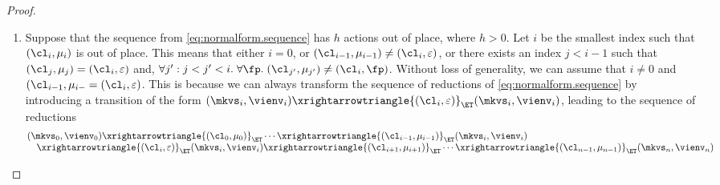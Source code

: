 \begin{proof}
\begin{enumerate}
\item Suppose that the sequence from \cref{eq:normalform.sequence} has $h$ actions out of place, 
where $h > 0$. Let $i$ be the smallest index such that $(\cl_{i}, \mu_{i})$ is out of place. 
This means that either $i = 0$, or $(\cl_{i-1}, \mu_{i-1}) \neq (\cl_{i}, \varepsilon)$, 
or there exists an index $j < i -1 $ such that $(\cl_{j}, \mu_{j}) = (\cl_{i}, \varepsilon)$ 
and, $\forall j': j < j' < i.\;\forall \fp.\;(\cl_{j'}, \mu_{j'}) \neq (\cl_{i}, \fp)$. 
Without loss of generality, we can assume that $i \neq 0$ and $(\cl_{i-1}, \mu_{i-} = (\cl_{i}, \varepsilon)$. 
This is because we can always transform the sequence of reductions of \cref{eq:normalform.sequence} by 
introducing a transition of the form $(\mkvs_{i}, \vienv_{i}) \xrightarrowtriangle{(\cl_{i}, \varepsilon)}_{\ET}
(\mkvs_{i}, \vienv_{i})$, leading to the sequence of reductions
\[
\begin{array}{@{}l@{}}
(\mkvs_{0}, \vienv_{0}) \xrightarrowtriangle{(\cl_{0}, \mu_{0})}_{\ET} \cdots \xrightarrowtriangle{(\cl_{i-1}, \mu_{i-1})}_{\ET}
(\mkvs_{i}, \vienv_{i}) \\
\quad \xrightarrowtriangle{(\cl_{i}, \varepsilon)}_{\ET} (\mkvs_{i}, \vienv_{i}) \xrightarrowtriangle{(\cl_{i+1}, \mu_{i+1})}_{\ET} 
\cdots \xrightarrowtriangle{(\cl_{n-1}, \mu_{n-1})}_{\ET} (\mkvs_{n}, \vienv_{n})
\end{array}
\]


\end{enumerate}
\end{proof}
